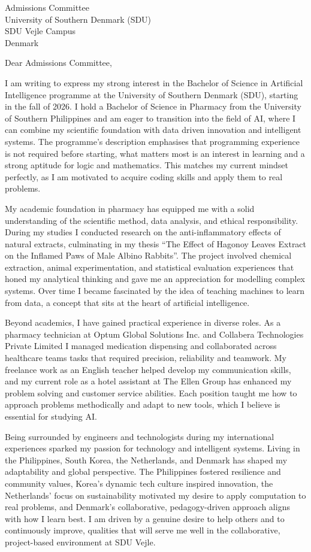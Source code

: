 \documentclass[11pt,a4paper]{letter}
\date{February 22, 2026}
\begin{document}
\begin{letter}{Admissions Committee \\ University of Southern Denmark (SDU) \\ SDU Vejle Campus \\ Denmark}

\opening{Dear Admissions Committee,}

I am writing to express my strong interest in the Bachelor of Science in Artificial Intelligence programme at the University of Southern Denmark (SDU), starting in the fall of 2026. I hold a Bachelor of Science in Pharmacy from the University of Southern Philippines and am eager to transition into the field of AI, where I can combine my scientific foundation with data driven innovation and intelligent systems. The programme's description emphasises that programming experience is not required before starting, what matters most is an interest in learning and a strong aptitude for logic and mathematics. This matches my current mindset perfectly, as I am motivated to acquire coding skills and apply them to real problems.

My academic foundation in pharmacy has equipped me with a solid understanding of the scientific method, data analysis, and ethical responsibility. During my studies I conducted research on the anti-inflammatory effects of natural extracts, culminating in my thesis \enquote{The Effect of Hagonoy Leaves Extract on the Inflamed Paws of Male Albino Rabbits}. The project involved chemical extraction, animal experimentation, and statistical evaluation experiences that honed my analytical thinking and gave me an appreciation for modelling complex systems. Over time I became fascinated by the idea of teaching machines to learn from data, a concept that sits at the heart of artificial intelligence.

Beyond academics, I have gained practical experience in diverse roles. As a pharmacy technician at Optum Global Solutions Inc. and Collabera Technologies Private Limited I managed medication dispensing and collaborated across healthcare teams tasks that required precision, reliability and teamwork. My freelance work as an English teacher helped develop my communication skills, and my current role as a hotel assistant at The Ellen Group has enhanced my problem solving and customer service abilities. Each position taught me how to approach problems methodically and adapt to new tools, which I believe is essential for studying AI.

Being surrounded by engineers and technologists during my international experiences sparked my passion for technology and intelligent systems. Living in the Philippines, South Korea, the Netherlands, and Denmark has shaped my adaptability and global perspective. The Philippines fostered resilience and community values, Korea's dynamic tech culture inspired innovation, the Netherlands' focus on sustainability motivated my desire to apply computation to real problems, and Denmark's collaborative, pedagogy-driven approach aligns with how I learn best. I am driven by a genuine desire to help others and to continuously improve, qualities that will serve me well in the collaborative, project-based environment at SDU Vejle.


\end{letter}
\end{document}
